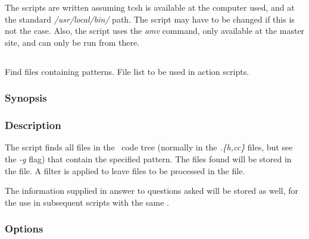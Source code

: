 The scripts are written assuming tcsh is available at the computer used, and
at the standard {\em /usr/local/bin/} path. The script may have to be changed
if this is not the case. Also, the  script uses the {\em amv}
command, only available at the master site, and can only be run from there.


\subsection{}
\label{UPfind}

Find files containing patterns. File list to be used in action 
scripts.

\subsubsection*{Synopsis}

\begin{synopsis}
\end{synopsis}

\subsubsection*{Description}

The  script finds all files in the \aipspp\ code tree (normally
in the {\em .\{h,cc\}} files, but see the {\em -g} flag) that contain the
specified pattern. The files found will be stored in the  file. A filter is applied to leave files to be processed in the
 file.

The information supplied in answer to questions asked will be stored as well,
for the use in subsequent scripts with the same .

\subsubsection*{Options}

